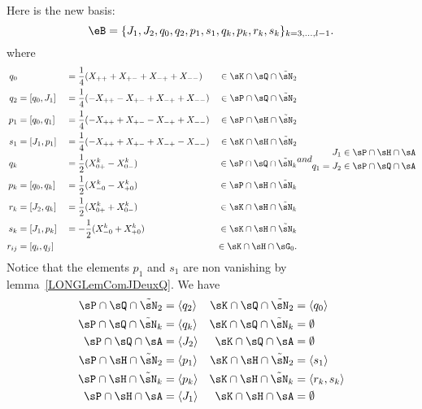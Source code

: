 Here is the new basis:
%
\begin{equation}		\label{LONGEqSuperBaseeB}
	\eB=\{J_1,J_2, q_0,q_2,p_1,s_1,q_k,p_k,r_k,s_k \}_{k=3,\ldots,l-1}.
\end{equation}
%
where
\begin{subequations}		\label{LONGSubEqsBaseSuperTsNTrois}\label{LONGEqDecompqprskXX}
	\begin{align}
		q_0&		&&=\frac{1}{ 4 }(X_{++}+X_{+-}+X_{-+}+X_{--})	&\in\sK\cap\sQ\cap\tilde\sN_2\\
		q_2&=[q_0,J_1]	&&=\frac{1}{ 4 }(-X_{++}-X_{+-}+X_{-+}+X_{--})	&\in\sP\cap\sQ\cap\tilde\sN_2\\
		p_1&=[q_0,q_1]	&&=\frac{1}{ 4 }(-X_{++}+X_{+-}-X_{-+}+X_{--})	&\in\sP\cap\sH\cap\tilde\sN_2	\label{LONGEqqzqupuDef}\\
		s_1&=[J_1,p_1]	&&=\frac{1}{ 4 }(-X_{++}+X_{+-}+X_{-+}-X_{--})	&\in\sK\cap\sH\cap\tilde\sN_2\\
		q_k&		&&=\frac{ 1 }{2}(X_{0+}^k-X_{0-}^k)	&\in\sP\cap\sQ\cap\tilde\sN_k	\\
		p_k&=[q_0,q_k]	&&=\frac{ 1 }{ 2 }(X_{-0}^k-X_{+0}^k)	&\in\sP\cap\sH\cap\tilde\sN_k	\\
		r_k&=[J_2,q_k]	&&=\frac{ 1 }{2}(X^k_{0+}+X^k_{0-})	&\in\sK\cap\sH\cap\tilde\sN_k	\\
		s_k&=[J_1,p_k]	&&=-\frac{ 1 }{2}(X^k_{-0}+X^k_{+0})	&\in\sK\cap\sH\cap\tilde\sN_k	\\
		r_{ij}&=[q_i,q_j]&&					&\in\sK\cap\sH\cap\sG_0.
	\end{align}
and
	\begin{align}
		J_1&\in\sP\cap\sH\cap\sA\\
		q_1=J_2&\in\sP\cap\sQ\cap\sA
	\end{align}
\end{subequations}
Notice that the elements $p_1$ and $s_1$ are non vanishing by lemma~\ref{LONGLemComJDeuxQ}. We have
\begin{subequations}
	\begin{align}
		\sP\cap\sQ\cap\tilde\sN_2&=\langle q_2\rangle	&	\sK\cap\sQ\cap\tilde\sN_2&=\langle q_0\rangle\\
		\sP\cap\sQ\cap\tilde\sN_k&=\langle q_k\rangle	&	\sK\cap\sQ\cap\tilde\sN_k&=\emptyset\\
		\sP\cap\sQ\cap\sA&=\langle J_2\rangle	&	\sK\cap\sQ\cap\sA&= \emptyset\\
		\sP\cap\sH\cap\tilde\sN_2&=\langle p_1\rangle	&	\sK\cap\sH\cap\tilde\sN_2&=\langle s_1\rangle\\
		\sP\cap\sH\cap\tilde\sN_k&=\langle p_k\rangle	&	\sK\cap\sH\cap\tilde\sN_k&=\langle r_k,s_k\rangle\\
		\sP\cap\sH\cap\sA&=\langle J_1\rangle	&	\sK\cap\sH\cap\sA&=\emptyset
	\end{align}
\end{subequations}

